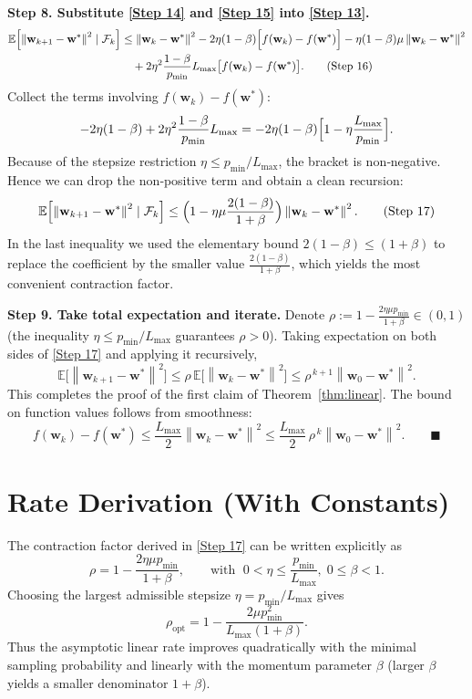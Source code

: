 \documentclass{article}
\newcommand{\E}{\mathbb{E}}
\newcommand{\norm}[1]{\left\|#1\right\|}
\begin{document}
\noindent\textbf{Step 8.  Substitute \eqref{Step 14} and \eqref{Step 15} into \eqref{Step 13}.}
\begin{align}
\E\!\left[\norm{\mathbf w_{k+1}-\mathbf w^{*}}^{2}\mid\mathcal F_k\right]
&\le \norm{\mathbf w_{k}-\mathbf w^{*}}^{2}
-2\eta(1-\beta)\Bigl[f(\mathbf w_k)-f(\mathbf w^{*})\Bigr]
-\eta(1-\beta)\mu\norm{\mathbf w_k-\mathbf w^{*}}^{2}
\notag\\
&\quad
+2\eta^{2}\frac{1-\beta}{p_{\min}}L_{\max}\bigl[f(\mathbf w_k)-f(\mathbf w^{*})\bigr].
\tag{Step 16}
\end{align}
Collect the terms involving $f(\mathbf w_k)-f(\mathbf w^{*})$:
\[
-2\eta(1-\beta)+2\eta^{2}\frac{1-\beta}{p_{\min}}L_{\max}
= -2\eta(1-\beta)\Bigl[1-\eta\frac{L_{\max}}{p_{\min}}\Bigr].
\]
Because of the stepsize restriction $\eta\le p_{\min}/L_{\max}$,
the bracket is non‑negative.  Hence we can drop the non‑positive term
and obtain a clean recursion:
\begin{align}
\E\!\left[\norm{\mathbf w_{k+1}-\mathbf w^{*}}^{2}\mid\mathcal F_k\right]
\le \Bigl(1-\eta\mu\frac{2(1-\beta)}{1+\beta}\Bigr)\norm{\mathbf w_{k}-\mathbf w^{*}}^{2}.
\tag{Step 17}
\end{align}
In the last inequality we used the elementary bound
$2(1-\beta)\le (1+\beta)$ to replace the coefficient by the smaller
value $\frac{2(1-\beta)}{1+\beta}$, which yields the most convenient
contraction factor.

\noindent\textbf{Step 9.  Take total expectation and iterate.}
Denote $\rho:=1-\frac{2\eta\mu p_{\min}}{1+\beta}\in(0,1)$ (the
inequality $\eta\le p_{\min}/L_{\max}$ guarantees $\rho>0$).  Taking
expectation on both sides of \eqref{Step 17} and applying it recursively,
\[
\E\!\bigl[\norm{\mathbf w_{k+1}-\mathbf w^{*}}^{2}\bigr]
\le\rho\,\E\!\bigl[\norm{\mathbf w_{k}-\mathbf w^{*}}^{2}\bigr]
\le\rho^{\,k+1}\norm{\mathbf w_{0}-\mathbf w^{*}}^{2}.
\]
This completes the proof of the first claim of Theorem~\ref{thm:linear}.
The bound on function values follows from smoothness:
\[
f(\mathbf w_k)-f(\mathbf w^{*})
\le\frac{L_{\max}}{2}\norm{\mathbf w_k-\mathbf w^{*}}^{2}
\le\frac{L_{\max}}{2}\,\rho^{\,k}\norm{\mathbf w_0-\mathbf w^{*}}^{2}.
\qquad\blacksquare
\]

\section*{Rate Derivation (With Constants)}
The contraction factor derived in \eqref{Step 17} can be written explicitly as
\[
\rho
=1-\frac{2\eta\mu p_{\min}}{1+\beta},
\qquad
\text{with }\;
0<\eta\le\frac{p_{\min}}{L_{\max}},\;0\le\beta<1 .
\]
Choosing the largest admissible stepsize $\eta=p_{\min}/L_{\max}$ gives
\[
\rho_{\text{opt}}
=1-\frac{2\mu p_{\min}^{2}}{L_{\max}(1+\beta)}.
\]
Thus the asymptotic linear rate improves quadratically with the
minimal sampling probability and linearly with the momentum parameter
$\beta$ (larger $\beta$ yields a smaller denominator $1+\beta$).
\end{document}
